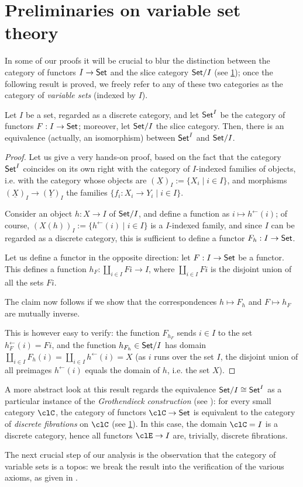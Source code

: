 \documentclass{amsart}
\begin{document}
\section{Preliminaries on variable set theory}
In some of our proofs it will be crucial to blur the distinction between the category of functors $I \to \mathsf{Set}$ and the slice category $\mathsf{Set}/I$ (see \ref{}); once the following result is proved, we freely refer to any of these two categories as the category of \emph{variable sets} (indexed by $I$).
\begin{proposition}
  Let $I$ be a set, regarded as a discrete category, and let $\mathsf{Set}^I$ be the category of functors $F : I \to \mathsf{Set}$; moreover, let $\mathsf{Set}/I$ the slice category. Then, there is an equivalence (actually, an isomorphism) between $\mathsf{Set}^I$ and $\mathsf{Set}/I$.
\end{proposition}
\begin{proof}
  Let us give a very hands-on proof, based on the fact that the category $\mathsf{Set}^I$ coincides on its own right with the category of $I$-indexed families of objects, i.e. with the category whose objects are $(\underline X)_I := \{X_i\mid i\in I\}$, and morphisms $(\underline X)_I\to (\underline Y)_I$ the families $\{f_i : X_i \to Y_i\mid i \in I\}$.

  Consider an object $h : X\to I$ of $\mathsf{Set}/I$, and define a function as $i\mapsto h^\leftarrow(i)$; of course, $(X(h))_I := \{h^\leftarrow(i) \mid i \in I\}$ is a $I$-indexed family, and since $I$ can be regarded as a discrete category, this is sufficient to define a functor $F_h : I \to \mathsf{Set}$.

  Let us define a functor in the opposite direction: let $F : I \to \mathsf{Set}$ be a functor. This defines a function $h_F : \coprod_{i\in I}Fi \to I$, where $\coprod_{i\in I} Fi$ is the disjoint union of all the sets $Fi$.

  The claim now follows if we show that the correspondences $h\mapsto F_h$ and $F\mapsto h_F$ are mutually inverse.

  This is however easy to verify: the function $F_{h_F}$ sends $i\in I$ to the set $h_F^\leftarrow(i)=Fi$, and the function $h_{F_h} \in \mathsf{Set}/I$ has domain $\coprod_{i\in I}F_h(i) = \coprod_{i\in I}h^\leftarrow(i)=X$ (as $i$ runs over the set $I$, the disjoint union of all preimages $h^\leftarrow(i)$ equals the domain of $h$, i.e. the set $X$).
\end{proof}
\begin{remark}
  A more abstract look at this result regards the equivalence $\mathsf{Set}/I\cong \mathsf{Set}^I$ as a particular instance of the \emph{Grothendieck construction} (see \cite{}): for every small category $\clC$, the category of functors $\clC\to\Set$ is equivalent to the category of \emph{discrete fibrations} on $\clC$ (see \ref{}). In this case, the domain $\clC=I$ is a discrete category, hence all functors $\clE \to I$ are, trivially, discrete fibrations.
\end{remark}
The next crucial step of our analysis is the observation that the category of variable sets is a topos: we break the result into the verification of the various axioms, as given in \cite{}.
\end{document}
